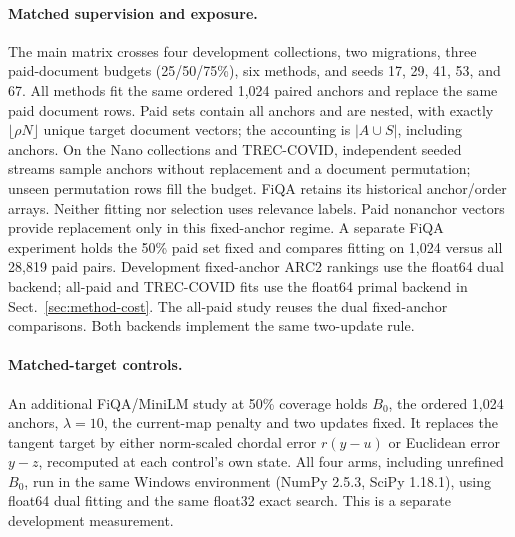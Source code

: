 \paragraph{Matched supervision and exposure.}
The main matrix crosses four development collections, two migrations,
three paid-document budgets (25/50/75\%), six methods, and seeds
17, 29, 41, 53, and 67. All methods fit the same ordered 1,024 paired anchors
and replace the same paid document rows. Paid sets contain all anchors and
are nested, with exactly $\lfloor \rho N\rfloor$ unique target document vectors;
the accounting is $|A\cup S|$, including anchors. On the Nano collections and
TREC-COVID, independent seeded streams sample anchors without replacement
and a document permutation; unseen permutation rows fill the budget. FiQA
retains its historical anchor/order arrays. Neither fitting nor selection uses
relevance labels. Paid nonanchor vectors provide replacement only in this
fixed-anchor regime. A separate FiQA experiment holds the 50\% paid set
fixed and compares fitting on 1,024 versus all 28,819 paid pairs.
Development fixed-anchor ARC2 rankings use the float64 dual backend;
all-paid and TREC-COVID fits use the float64 primal backend in
Sect.~\ref{sec:method-cost}. The all-paid study reuses the dual fixed-anchor
comparisons. Both backends implement the same two-update rule.

\paragraph{Matched-target controls.}
An additional FiQA/MiniLM study at 50\% coverage holds $B_0$, the ordered
1,024 anchors, $\lambda=10$, the current-map penalty and two updates fixed.
It replaces the tangent target by either norm-scaled chordal error
$r(y-u)$ or Euclidean error $y-z$, recomputed at each control's own state.
All four arms, including unrefined $B_0$, run in the same Windows environment
(NumPy 2.5.3, SciPy 1.18.1), using float64 dual fitting and the same float32
exact search. This is a separate development measurement.

